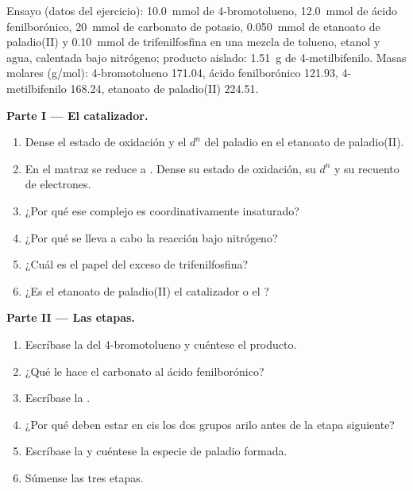 \begin{problem}
\label{pb:b2:catalytic-cycles:1}
Ensayo (datos del ejercicio): \qty{10.0}{mmol} de 4-bromotolueno, \qty{12.0}{mmol} de
ácido fenilborónico, \qty{20}{mmol} de carbonato de potasio, \qty{0.050}{mmol} de etanoato de
paladio(II) y \qty{0.10}{mmol} de trifenilfosfina en una mezcla de tolueno, etanol y
agua, calentada bajo nitrógeno; producto aislado: \qty{1.51}{g} de 4-metilbifenilo. Masas
molares (\unit{g/mol}): 4-bromotolueno 171.04, ácido fenilborónico 121.93, 4-metilbifenilo
168.24, etanoato de paladio(II) 224.51.

\medskip
\noindent\textbf{Parte I --- El catalizador.}
\begin{enumerate}
  \item Dense el estado de oxidación y el $d^n$ del paladio en el etanoato de paladio(II).
  \item En el matraz se reduce a . Dense su estado de oxidación, su $d^n$ y su
        recuento de electrones.
  \item ¿Por qué ese complejo es coordinativamente insaturado?
  \item ¿Por qué se lleva a cabo la reacción bajo nitrógeno?
  \item ¿Cuál es el papel del exceso de trifenilfosfina?
  \item ¿Es el etanoato de paladio(II) el catalizador o el ?
\end{enumerate}

\medskip
\noindent\textbf{Parte II --- Las etapas.}
\begin{enumerate}[resume]
  \item Escríbase la  del 4-bromotolueno y cuéntese el producto.
  \item ¿Qué le hace el carbonato al ácido fenilborónico?
  \item Escríbase la .
  \item ¿Por qué deben estar en cis los dos grupos arilo antes de la etapa siguiente?
  \item Escríbase la  y cuéntese la especie de paladio formada.
  \item Súmense las tres etapas.
\end{enumerate}


\end{problem}
